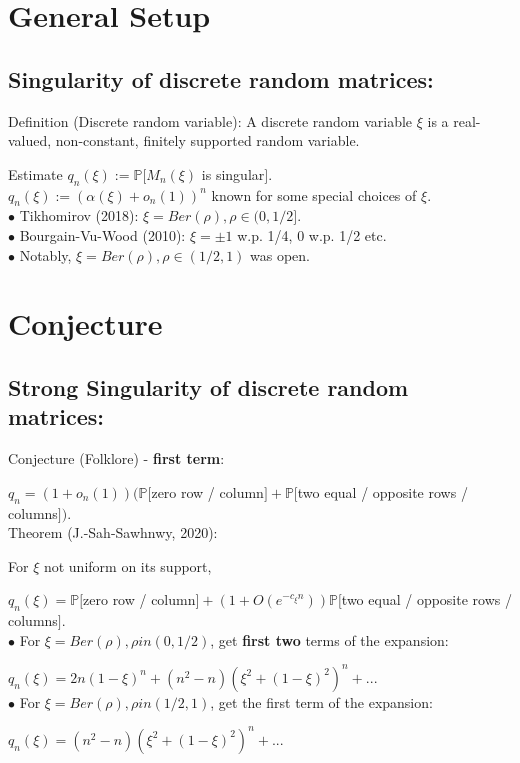 \documentclass{article}
\begin{document}
\section{General Setup}
\subsection{Singularity of discrete random matrices:}
Definition (Discrete random variable): A discrete random variable $\xi$ is a real-valued, non-constant, finitely supported random variable.

Estimate $ q_n(\xi) := \mathbb{P}[M_n(\xi)$ is singular$] $.\\
$ q_n(\xi) := (\alpha(\xi) + o_n(1))^n$ known for some special choices of $\xi $.\\
$\bullet$ {Tikhomirov (2018): $ \xi = Ber(\rho) , \rho \in (0, 1/2]$}.\\
$\bullet$ {Bourgain-Vu-Wood (2010): $ \xi = \pm 1$ w.p. 1/4, 0 w.p. 1/2 etc}.\\
$\bullet$ {Notably, $ \xi = Ber(\rho), \rho \in (1/2, 1)$ was open}.\\

\section{Conjecture}
\subsection{Strong Singularity of discrete random matrices:}
Conjecture (Folklore) - \textbf{first term}:

$q_n = (1 + o_n(1))(\mathbb{P}[$zero row / column$] + \mathbb{P}[$two equal / opposite rows / columns$])$. \\
Theorem (J.-Sah-Sawhnwy, 2020):

For $\xi$ not uniform on its support,

$q_n(\xi) = \mathbb{P}[$zero row / column$] + (1 + O(e^{-c_{\xi}n}))\mathbb{P}[$two equal / opposite rows / columns$]$. \\
$\bullet$ {For $ \xi = Ber(\rho), \rho in (0, 1/2)$, get \textbf{first two} terms of the expansion}:

$q_n(\xi) = 2n(1-\xi)^n + (n^2 - n)(\xi^2 + (1- \xi)^2)^n + ...$\\
$\bullet$ {For $ \xi = Ber(\rho), \rho in (1/2, 1)$, get the first term of the expansion}:

$q_n(\xi) = (n^2 - n)(\xi^2 + (1- \xi)^2)^n + ...$
\end{document}
